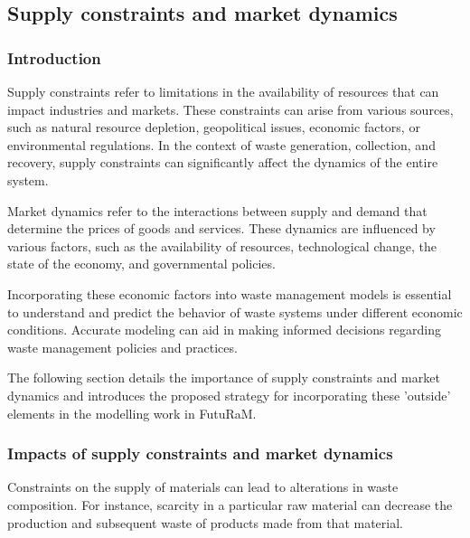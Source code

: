 \subsection{Supply constraints and market dynamics}


\subsubsection{Introduction}

Supply constraints refer to limitations in the availability of resources that can impact industries and markets. These constraints can arise from various sources, such as natural resource depletion, geopolitical issues, economic factors, or environmental regulations. In the context of waste generation, collection, and recovery, supply constraints can significantly affect the dynamics of the entire system.

Market dynamics refer to the interactions between supply and demand that determine the prices of goods and services. These dynamics are influenced by various factors, such as the availability of resources, technological change, the state of the economy, and governmental policies.

Incorporating these economic factors into waste management models is essential to understand and predict the behavior of waste systems under different economic conditions. Accurate modeling can aid in making informed decisions regarding waste management policies and practices.

The following section details the importance of supply constraints and market dynamics and introduces the proposed strategy for incorporating these 'outside' elements in the modelling work in FutuRaM.


\subsubsection{Impacts of supply constraints and market dynamics}

Constraints on the supply of materials can lead to alterations in waste composition. For instance, scarcity in a particular raw material can decrease the production and subsequent waste of products made from that material.


